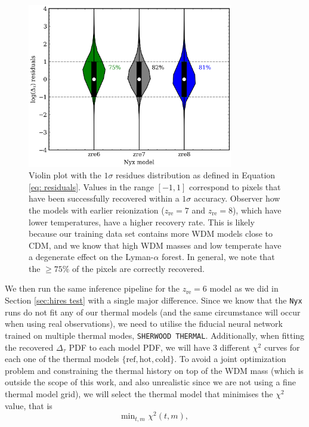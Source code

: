 \begin{figure}[h]
    \centering
    \includegraphics[width=0.8\textwidth]{img/ML/violin_nyx.png}
    \caption{Violin plot with the $1\sigma$ residues distribution as defined in Equation \ref{eq: residuals}. Values in the range $[-1,1]$ correspond to pixels that have been successfully recovered within a $1\sigma$ accuracy. Observer how the models with earlier reionization ($z_\mathrm{re}=7$ and $z_\mathrm{re}=8$), which have lower temperatures, have a higher recovery rate. This is likely because our training data set contains more WDM models close to CDM, and we know that high WDM masses and low temperate have a degenerate effect on the Lyman-$\alpha$ forest. In general, we note that the $\geq 75 \%$ of the pixels are correctly recovered.}
    \label{fig: nyx violin}
\end{figure}
We then run the same inference pipeline for the $z_\mathrm{re}=6$ model as we did in Section \ref{sec:hires test} with a single major difference. Since we know that the \texttt{Nyx} runs do not fit any of our thermal models (and the same circumstance will occur when using real observations), we need to utilise the fiducial neural network trained on multiple thermal modes, \texttt{SHERWOOD THERMAL}. Additionally, when fitting the recovered $\Delta_\tau$ PDF to each model PDF, we will have 3 different $\chi^2$ curves for each one of the thermal models $\{\mathrm{ref}, \mathrm{hot}, \mathrm{cold} \}$. To avoid a joint optimization problem and constraining the thermal history on top of the WDM mass (which is outside the scope of this work, and also unrealistic since we are not using a fine thermal model grid), we will select the thermal model that minimises the $\chi^2$ value, that is
\begin{equation}\label{eq: chi thermal def}
    \mathrm{min}_{t,m} \, \, \chi^2(t,m),
\end{equation}

